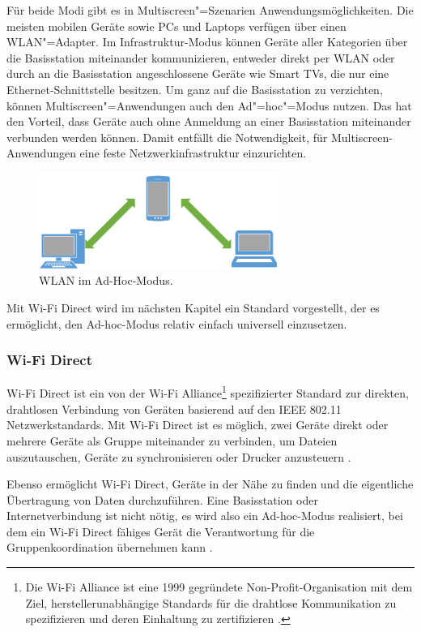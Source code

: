 Für beide Modi gibt es in Multiscreen"=Szenarien Anwendungsmöglichkeiten. Die meisten mobilen Geräte sowie PCs und Laptops verfügen über einen WLAN"=Adapter. Im Infrastruktur-Modus können Geräte aller Kategorien über die Basisstation miteinander kommunizieren, entweder direkt per \ac{WLAN} oder durch an die Basisstation angeschlossene Geräte wie \zb Smart TVs, die nur eine Ethernet-Schnittstelle besitzen. Um ganz auf die Basisstation zu verzichten, können Multiscreen"=Anwendungen auch den Ad"=hoc"=Modus nutzen. Das hat den Vorteil, dass Geräte auch ohne Anmeldung an einer Basisstation miteinander verbunden werden können. Damit entfällt die Notwendigkeit, für Multiscreen-Anwendungen eine feste Netzwerkinfrastruktur einzurichten.

\begin{figure}[h]
\centering
\includegraphics[width=0.7\textwidth]{bilder/ad_hoc_modus}
\caption{\ac{WLAN} im Ad-Hoc-Modus.}
\label{fig:adhoc_mode}
\end{figure}

Mit Wi-Fi Direct wird im nächsten Kapitel ein Standard vorgestellt, der es ermöglicht, den Ad-hoc-Modus relativ einfach universell einzusetzen.

\subsubsection{Wi-Fi Direct}
Wi-Fi Direct ist ein von der Wi-Fi Alliance\footnote{Die Wi-Fi Alliance ist eine 1999 gegründete Non-Profit-Organisation mit dem Ziel, her\-stel\-ler\-un\-ab\-häng\-ige Standards für die drahtlose Kommunikation zu spezifizieren und deren Einhaltung zu zertifizieren \citep{WifiAllianceAbout}.} spezifizierter Standard zur direkten, drahtlosen Verbindung von Geräten basierend auf den IEEE 802.11 Netzwerkstandards. Mit Wi-Fi Direct ist es möglich, zwei Geräte direkt oder mehrere Geräte als Gruppe miteinander zu verbinden, um \zb Dateien auszutauschen, Geräte zu synchronisieren oder Drucker anzusteuern \citep{WifiDirect}. 

Ebenso ermöglicht Wi-Fi Direct, Geräte in der Nähe zu finden und die eigentliche Übertragung von Daten durchzuführen. Eine Basisstation oder Internetverbindung ist nicht nötig, es wird also ein Ad-hoc-Modus realisiert, bei dem ein Wi-Fi Direct fähiges Gerät die Verantwortung für die Gruppenkoordination übernehmen kann \citep{WifiDirect}.

